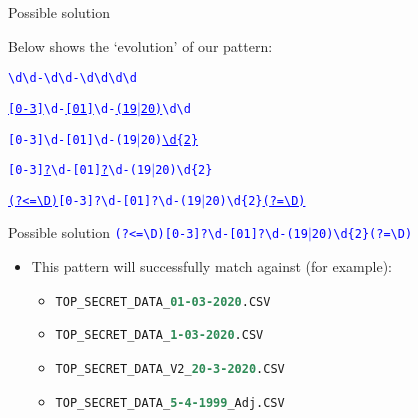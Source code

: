 \documentclass[
	usenames,
	dvipsnames,
] {beamer}
\newcommand{\reDigit}{\textbackslash{}d}
\newcommand{\reNonDigit}{\textbackslash{}D}
\newcommand{\rePattern}[1]{{\Large\texttt{\textcolor{blue}{#1}}}}
\begin{document}
\begin{frame}{Possible solution}

	Below shows the `evolution' of our pattern: \\
	\bigskip
	
	\rePattern{\reDigit\reDigit-\reDigit\reDigit-\reDigit\reDigit\reDigit\reDigit} \\
		\pause
	\bigskip
	
	\rePattern{\underline{[0-3]}\reDigit-\underline{[01]}\reDigit-\underline{(19$|$20)}\reDigit\reDigit} \\
	      	\pause
	\bigskip
	      		
	\rePattern{[0-3]\reDigit-[01]\reDigit-(19$|$20)\underline{\reDigit\{2\}}} \\
	      	\pause
	\bigskip
      
      \rePattern{[0-3]\underline{?}\reDigit-[01]\underline{?}\reDigit-(19$|$20)\reDigit\{2\}} \\
		\pause
	\bigskip
	
	\rePattern{\underline{(?\textless=\reNonDigit)}[0-3]?\reDigit-[01]?\reDigit-(19$|$20)\reDigit\{2\}\underline{(?=\reNonDigit)}} \\
\end{frame}
    
\begin{frame}{Possible solution}
	\rePattern{(?\textless=\reNonDigit)[0-3]?\reDigit-[01]?\reDigit-(19$|$20)\reDigit\{2\}(?=\reNonDigit)}
		\pause
		
	\medskip
	\begin{itemize}[label=\textbullet]
		\item This pattern will successfully match against (for example):
		      \pause
		      \begin{itemize}[label=\textendash]
		      	\item \texttt{TOP\_SECRET\_DATA\_\textbf{\textcolor{SeaGreen}{01-03-2020}}.CSV}
		      	      \pause
		      	\item \texttt{TOP\_SECRET\_DATA\_\textbf{\textcolor{SeaGreen}{1-03-2020}}.CSV}
		      	      \pause
		      	\item \texttt{TOP\_SECRET\_DATA\_V2\_\textbf{\textcolor{SeaGreen}{20-3-2020}}.CSV}
		      	      \pause
		      	\item \texttt{TOP\_SECRET\_DATA\_\textbf{\textcolor{SeaGreen}{5-4-1999}}\_Adj.CSV}
		      \end{itemize}
	\end{itemize}
\end{frame}
\end{document}
